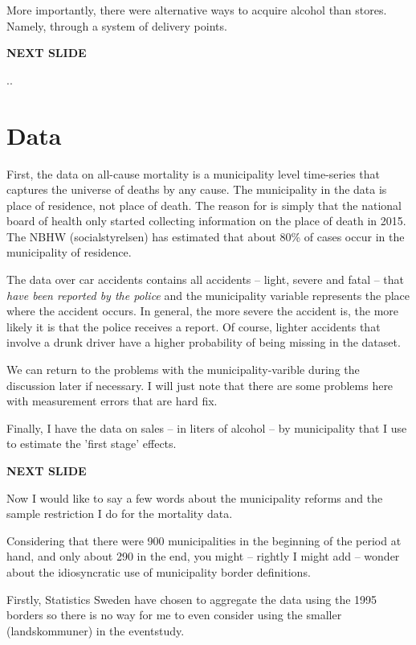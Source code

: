 \documentclass[12pt]{article}
\begin{document}
 More importantly, there were alternative ways to acquire alcohol than stores. Namely, through a system of delivery points.

 \textbf{NEXT SLIDE}

 ..





\section{Data}

First, the data on all-cause mortality is a municipality level time-series that captures the universe of deaths by any cause. The municipality in the data is place of residence, not place of death. The reason for is simply that the national board of health only started collecting information on the place of death in 2015. The NBHW (socialstyrelsen) has estimated that about 80\% of cases occur in the municipality of residence.

The data over car accidents contains all accidents -- light, severe and fatal -- that \emph{have been reported by the police}  and the municipality variable represents the place where the accident occurs. In general, the more severe the accident is, the more likely it is that the police receives a report. Of course, lighter accidents that involve a drunk driver have a higher probability of being missing in the dataset.

We can return to the problems with the municipality-varible during the discussion later if necessary. I will just note that there are some problems here with measurement errors that are hard fix.

Finally, I have the data on sales -- in liters of alcohol -- by municipality that I use to estimate the 'first stage' effects.

 \textbf{NEXT SLIDE}

 Now I would like to say a few words about the municipality reforms and the sample restriction I do for the mortality data. 

 Considering that there were 900 municipalities in the beginning of the period at hand, and only about 290 in the end, you might -- rightly I might add -- wonder about the idiosyncratic use of municipality border definitions. 


Firstly, Statistics Sweden have chosen to aggregate the data using the 1995 borders so there is no way for me to even consider using the smaller (landskommuner) in the eventstudy. 
\end{document}
